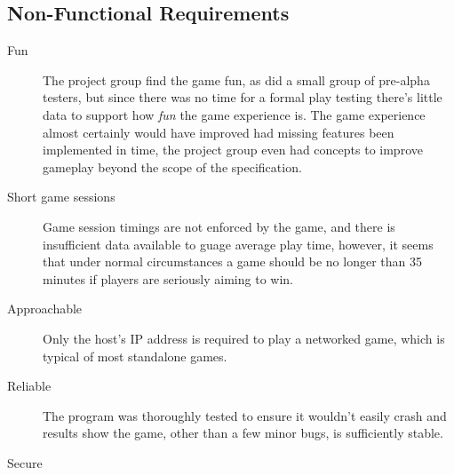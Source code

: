 \subsection{Non-Functional Requirements}
\begin{description}
  \item[Fun] The project group find the game fun, as did a small group of pre-alpha testers, but since there was no time for a formal play testing there's little data to support how \emph{fun} the game experience is. The game experience almost certainly would have improved had missing features been implemented in time, the project group even had concepts to improve gameplay beyond the scope of the specification.
    
  \item[Short game sessions] Game session timings are not enforced by the game, and there is insufficient data available to guage average play time, however, it seems that under normal circumstances a game should be no longer than 35 minutes if players are seriously aiming to win.

  \item[Approachable] Only the host's IP address is required to play a networked game, which is typical of most standalone games.  

  \item[Reliable] The program was thoroughly tested to ensure it wouldn't easily crash and results show the game, other than a few minor bugs, is sufficiently stable.

  \item[Secure] %

\end{description}
